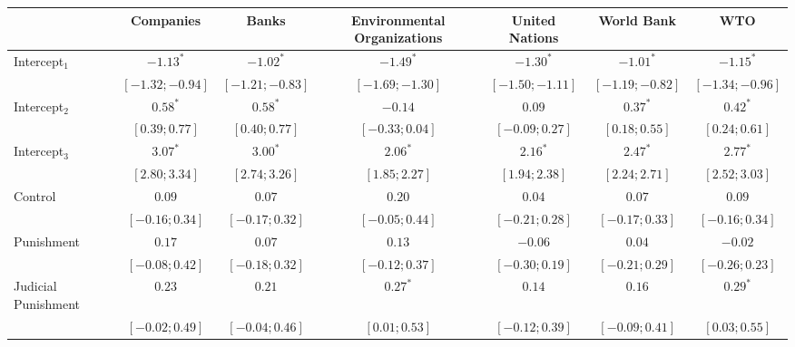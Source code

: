 \usepackage{threeparttable}

\begin{table}[h]
\begin{center}
\begin{threeparttable}
\begin{tabular}{l c c c c c c}
\hline
 & Companies & Banks & Environmental Organizations & United Nations & World Bank & WTO \\
\hline
Intercept$_1$       & $-1.13^{*}$       & $-1.02^{*}$       & $-1.49^{*}$       & $-1.30^{*}$       & $-1.01^{*}$       & $-1.15^{*}$       \\
                    & $ [-1.32; -0.94]$ & $ [-1.21; -0.83]$ & $ [-1.69; -1.30]$ & $ [-1.50; -1.11]$ & $ [-1.19; -0.82]$ & $ [-1.34; -0.96]$ \\
Intercept$_2$       & $0.58^{*}$        & $0.58^{*}$        & $-0.14$           & $0.09$            & $0.37^{*}$        & $0.42^{*}$        \\
                    & $ [ 0.39;  0.77]$ & $ [ 0.40;  0.77]$ & $ [-0.33;  0.04]$ & $ [-0.09;  0.27]$ & $ [ 0.18;  0.55]$ & $ [ 0.24;  0.61]$ \\
Intercept$_3$       & $3.07^{*}$        & $3.00^{*}$        & $2.06^{*}$        & $2.16^{*}$        & $2.47^{*}$        & $2.77^{*}$        \\
                    & $ [ 2.80;  3.34]$ & $ [ 2.74;  3.26]$ & $ [ 1.85;  2.27]$ & $ [ 1.94;  2.38]$ & $ [ 2.24;  2.71]$ & $ [ 2.52;  3.03]$ \\
Control             & $0.09$            & $0.07$            & $0.20$            & $0.04$            & $0.07$            & $0.09$            \\
                    & $ [-0.16;  0.34]$ & $ [-0.17;  0.32]$ & $ [-0.05;  0.44]$ & $ [-0.21;  0.28]$ & $ [-0.17;  0.33]$ & $ [-0.16;  0.34]$ \\
Punishment          & $0.17$            & $0.07$            & $0.13$            & $-0.06$           & $0.04$            & $-0.02$           \\
                    & $ [-0.08;  0.42]$ & $ [-0.18;  0.32]$ & $ [-0.12;  0.37]$ & $ [-0.30;  0.19]$ & $ [-0.21;  0.29]$ & $ [-0.26;  0.23]$ \\
Judicial Punishment & $0.23$            & $0.21$            & $0.27^{*}$        & $0.14$            & $0.16$            & $0.29^{*}$        \\
                    & $ [-0.02;  0.49]$ & $ [-0.04;  0.46]$ & $ [ 0.01;  0.53]$ & $ [-0.12;  0.39]$ & $ [-0.09;  0.41]$ & $ [ 0.03;  0.55]$ \\

\end{tabular}
\end{threeparttable}
\end{center}
\end{table}
